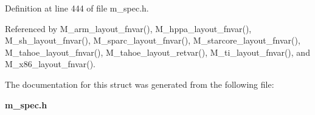 Definition at line 444 of file m\_\-spec.h.

Referenced by M\_\-arm\_\-layout\_\-fnvar(), M\_\-hppa\_\-layout\_\-fnvar(), M\_\-sh\_\-layout\_\-fnvar(), M\_\-sparc\_\-layout\_\-fnvar(), M\_\-starcore\_\-layout\_\-fnvar(), M\_\-tahoe\_\-layout\_\-fnvar(), M\_\-tahoe\_\-layout\_\-retvar(), M\_\-ti\_\-layout\_\-fnvar(), and M\_\-x86\_\-layout\_\-fnvar().

The documentation for this struct was generated from the following file:\begin{CompactItemize}
\item 
\bf{m\_\-spec.h}\end{CompactItemize}

